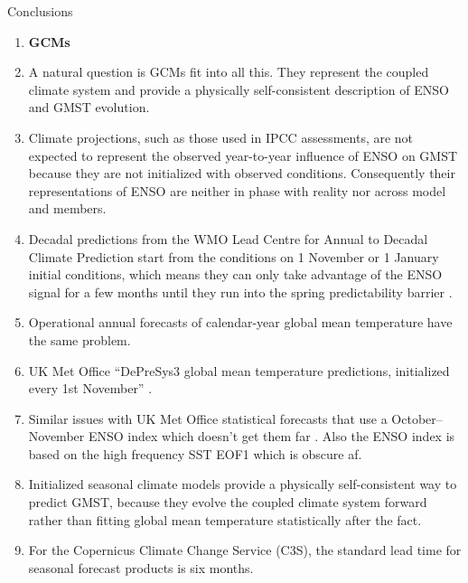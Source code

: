 \documentclass[aspectratio=169,xcolor=dvipsnames]{beamer}
\begin{document}
\begin{frame}[allowframebreaks]{Conclusions}
\begin{enumerate}
\end{enumerate}


\begin{enumerate}\fontsize{6pt}{8pt}\selectfont

\item \textbf{GCMs}

\item A natural question is GCMs fit into all this. They represent the
  coupled climate system and provide a physically self-consistent
  description of ENSO and GMST evolution.

\item Climate projections, such as those used in IPCC assessments, are
  not expected to represent the observed year-to-year influence of
  ENSO on GMST because they are not initialized with observed
  conditions. Consequently their representations of ENSO are neither
  in phase with reality nor across model and members.

  
\item Decadal predictions from the WMO Lead Centre for Annual to
  Decadal Climate Prediction start from the conditions on 1 November
  or 1 January initial conditions, which means they can only take
  advantage of the ENSO signal for a few months until they run into
  the spring predictability barrier
  \citep{Hermanson2022wmo,WMO2025GADCU}.

  
\item Operational annual forecasts of calendar-year global mean
  temperature have the same problem.

\item UK Met Office ``DePreSys3 global mean temperature predictions,
  initialized every 1st November'' \citep{Dunstone2024will}.
  
\item Similar issues with UK Met Office statistical forecasts that use
  a October–November ENSO index which doesn't get them far
  \citep{Folland2025review}. Also the ENSO index is based on the high
  frequency SST EOF1 which is obscure af.

\item Initialized seasonal climate models provide a physically
  self-consistent way to predict GMST, because they
  evolve the coupled climate system forward rather than fitting global
  mean temperature statistically after the fact.

\item For the Copernicus Climate Change Service (C3S), the standard
  lead time for seasonal forecast products is six months.
  

\end{enumerate}
\end{frame}
\end{document}
